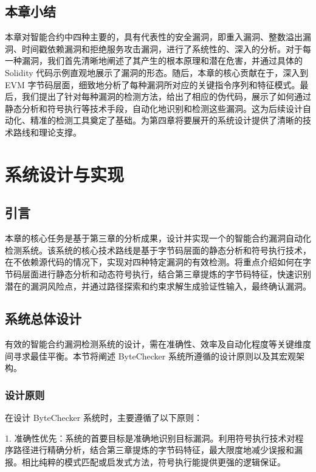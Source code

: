 \documentclass[print, master, vlined, timesmath]{DissertUESTC}
\begin{document}
\section{本章小结}

本章对智能合约中四种主要的，具有代表性的安全漏洞，即重入漏洞、整数溢出漏洞、时间戳依赖漏洞和拒绝服务攻击漏洞，进行了系统性的、深入的分析。对于每一种漏洞，我们首先清晰地阐述了其产生的根本原理和潜在危害，并通过具体的 Solidity 代码示例直观地展示了漏洞的形态。随后，本章的核心贡献在于，深入到 EVM 字节码层面，细致地分析了每种漏洞所对应的关键指令序列和特征模式。最后，我们提出了针对每种漏洞的检测方法，给出了相应的伪代码，展示了如何通过静态分析和符号执行等技术手段，自动化地识别和检测这些漏洞。这为后续设计自动化、精准的检测工具奠定了基础。为第四章将要展开的系统设计提供了清晰的技术路线和理论支撑。

\chapter{系统设计与实现}

\section{引言}

本章的核心任务是基于第三章的分析成果，设计并实现一个的智能合约漏洞自动化检测系统。该系统的核心技术路线是基于字节码层面的静态分析和符号执行技术，在不依赖源代码的情况下，实现对四种特定漏洞的有效检测。将重点介绍如何在字节码层面进行静态分析和动态符号执行，结合第三章提炼的字节码特征，快速识别潜在的漏洞风险点，并通过路径探索和约束求解生成验证性输入，最终确认漏洞。

\section{系统总体设计}


有效的智能合约漏洞检测系统的设计，需在准确性、效率及自动化程度等关键维度间寻求最佳平衡。本节将阐述 ByteChecker 系统所遵循的设计原则以及其宏观架构。

\subsection{设计原则}

在设计 ByteChecker 系统时，主要遵循了以下原则：

1. 准确性优先：系统的首要目标是准确地识别目标漏洞。利用符号执行技术对程序路径进行精确分析，结合第三章提炼的字节码特征，最大限度地减少误报和漏报。相比纯粹的模式匹配或启发式方法，符号执行能提供更强的逻辑保证。
\end{document}
